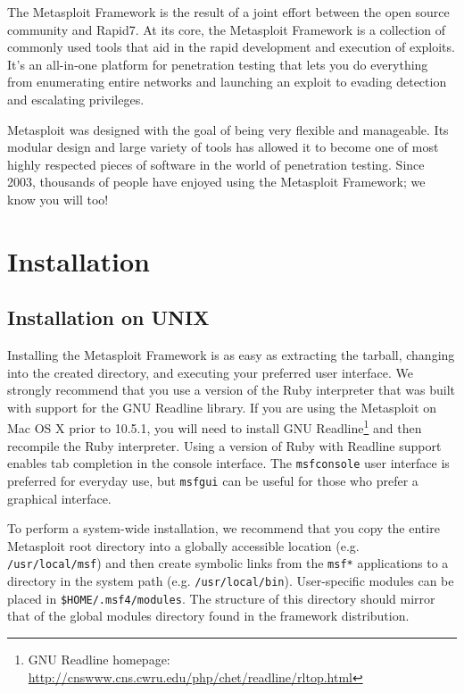 \documentclass{report}
\begin{document}
\par
The Metasploit Framework is the result of a joint effort between the open source
community and Rapid7. At its core, the Metasploit Framework is a collection of
commonly used tools that aid in the rapid development and execution of exploits.
It's an all-in-one platform for penetration testing that lets you do everything
from enumerating entire networks and launching an exploit to evading detection
and escalating privileges.

\par
Metasploit was designed with the goal of being very flexible and manageable.
Its modular design and large variety of tools has allowed it to become one of
most highly respected pieces of software in the world of penetration testing.
Since 2003, thousands of people have enjoyed using the Metasploit Framework;
we know you will too!

\pagebreak

\chapter{Installation}

    \section{Installation on UNIX}
    \label{INSTALL-UNIX}

\par
Installing the Metasploit Framework is as easy as extracting the tarball,
changing into the created directory, and executing your preferred user
interface. We strongly recommend that you use a version of the Ruby interpreter
that was built with support for the GNU Readline library. If you are using the
Metasploit on Mac OS X prior to 10.5.1, you will need to install GNU
Readline\footnote{GNU Readline homepage:
\url{http://cnswww.cns.cwru.edu/php/chet/readline/rltop.html}} and then
recompile the Ruby interpreter. Using a version of Ruby with Readline support
enables tab completion in the console interface. The \texttt{msfconsole} user
interface is preferred for everyday use, but \texttt{msfgui} can be useful for
those who prefer a graphical interface.

\par
To perform a system-wide installation, we recommend that you copy the entire
Metasploit root directory into a globally accessible location (e.g.
\texttt{/usr/local/msf}) and then create symbolic links from the \texttt{msf*}
applications to a directory in the system path (e.g. \texttt{/usr/local/bin}).
User-specific modules can be placed in \texttt{\$HOME/.msf4/modules}. The
structure of this directory should mirror that of the global modules directory
found in the framework distribution.
\end{document}
